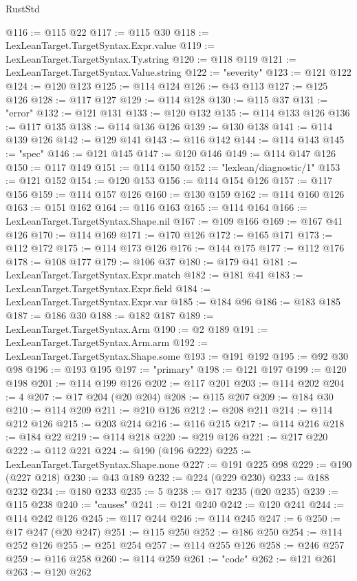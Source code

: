 \begin{lexlean}{RustStd}
\begin{coremodule}
{\begin{coremodule}
{{{{{{{{{{{{{{{{{{{{{{{{{{{{{{{{{{{{{{{{{{{{{{{{{{@116 := @115 @22
@117 := @115 @30
@118 := LexLeanTarget.TargetSyntax.Expr.value
@119 := LexLeanTarget.TargetSyntax.Ty.string
@120 := @118 @119
@121 := LexLeanTarget.TargetSyntax.Value.string
@122 := "severity"
@123 := @121 @122
@124 := @120 @123
@125 := @114 @124
@126 := @43 @113
@127 := @125 @126
@128 := @117 @127
@129 := @114 @128
@130 := @115 @37
@131 := "error"
@132 := @121 @131
@133 := @120 @132
@135 := @114 @133 @126
@136 := @117 @135
@138 := @114 @136 @126
@139 := @130 @138
@141 := @114 @139 @126
@142 := @129 @141
@143 := @116 @142
@144 := @114 @143
@145 := "spec"
@146 := @121 @145
@147 := @120 @146
@149 := @114 @147 @126
@150 := @117 @149
@151 := @114 @150
@152 := "lexlean/diagnostic/1"
@153 := @121 @152
@154 := @120 @153
@156 := @114 @154 @126
@157 := @117 @156
@159 := @114 @157 @126
@160 := @130 @159
@162 := @114 @160 @126
@163 := @151 @162
@164 := @116 @163
@165 := @114 @164
@166 := LexLeanTarget.TargetSyntax.Shape.nil
@167 := @109 @166
@169 := @167 @41 @126
@170 := @114 @169
@171 := @170 @126
@172 := @165 @171
@173 := @112 @172
@175 := @114 @173 @126
@176 := @144 @175
@177 := @112 @176
@178 := @108 @177
@179 := @106 @37
@180 := @179 @41
@181 := LexLeanTarget.TargetSyntax.Expr.match
@182 := @181 @41
@183 := LexLeanTarget.TargetSyntax.Expr.field
@184 := LexLeanTarget.TargetSyntax.Expr.var
@185 := @184 @96
@186 := @183 @185
@187 := @186 @30
@188 := @182 @187
@189 := LexLeanTarget.TargetSyntax.Arm
@190 := @2 @189
@191 := LexLeanTarget.TargetSyntax.Arm.arm
@192 := LexLeanTarget.TargetSyntax.Shape.some
@193 := @191 @192
@195 := @92 @30 @98
@196 := @193 @195
@197 := "primary"
@198 := @121 @197
@199 := @120 @198
@201 := @114 @199 @126
@202 := @117 @201
@203 := @114 @202
@204 := 4
@207 := @17 @204 (@20 @204)
@208 := @115 @207
@209 := @184 @30
@210 := @114 @209
@211 := @210 @126
@212 := @208 @211
@214 := @114 @212 @126
@215 := @203 @214
@216 := @116 @215
@217 := @114 @216
@218 := @184 @22
@219 := @114 @218
@220 := @219 @126
@221 := @217 @220
@222 := @112 @221
@224 := @190 (@196 @222)
@225 := LexLeanTarget.TargetSyntax.Shape.none
@227 := @191 @225 @98
@229 := @190 (@227 @218)
@230 := @43 @189
@232 := @224 (@229 @230)
@233 := @188 @232
@234 := @180 @233
@235 := 5
@238 := @17 @235 (@20 @235)
@239 := @115 @238
@240 := "causes"
@241 := @121 @240
@242 := @120 @241
@244 := @114 @242 @126
@245 := @117 @244
@246 := @114 @245
@247 := 6
@250 := @17 @247 (@20 @247)
@251 := @115 @250
@252 := @186 @250
@254 := @114 @252 @126
@255 := @251 @254
@257 := @114 @255 @126
@258 := @246 @257
@259 := @116 @258
@260 := @114 @259
@261 := "code"
@262 := @121 @261
@263 := @120 @262
}}}}}}}}}}}}}}}}}}}}}}}}}}}}}}}}}}}}}}}}}}}}}}}}}}
\end{coremodule}}
\end{coremodule}
\end{lexlean}
